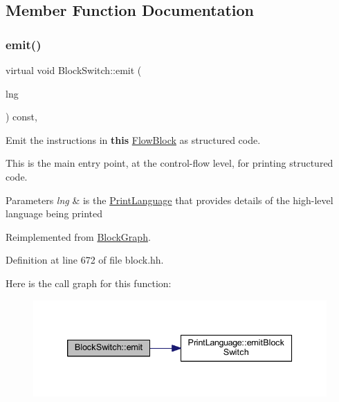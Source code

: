 \subsection{Member Function Documentation}
\mbox{\label{class_block_switch_ad1102b97e80c4dd7afa66891eb67a0d6}} 
\subsubsection{\texorpdfstring{emit()}{emit()}}
{\footnotesize\ttfamily virtual void Block\+Switch\+::emit (\begin{DoxyParamCaption}\item[{\mbox{\hyperlink{class_print_language}{Print\+Language}} $\ast$}]{lng }\end{DoxyParamCaption}) const\hspace{0.3cm}{\ttfamily [inline]}, {\ttfamily [virtual]}}



Emit the instructions in {\bfseries{this}} \mbox{\hyperlink{class_flow_block}{Flow\+Block}} as structured code. 

This is the main entry point, at the control-\/flow level, for printing structured code. 
\begin{DoxyParams}{Parameters}
{\em lng} & is the \mbox{\hyperlink{class_print_language}{Print\+Language}} that provides details of the high-\/level language being printed \\
\hline
\end{DoxyParams}


Reimplemented from \mbox{\hyperlink{class_block_graph_a535d3c7cb13e5e45b6e121b024fa339f}{Block\+Graph}}.



Definition at line 672 of file block.\+hh.

Here is the call graph for this function\+:
\nopagebreak
\begin{figure}[H]
\begin{center}
\leavevmode
\includegraphics[width=339pt]{class_block_switch_ad1102b97e80c4dd7afa66891eb67a0d6_cgraph}
\end{center}
\end{figure}
\mbox{\label{class_block_switch_a60c08166b6f3ae7c4ed03d622a843fc6}} 

